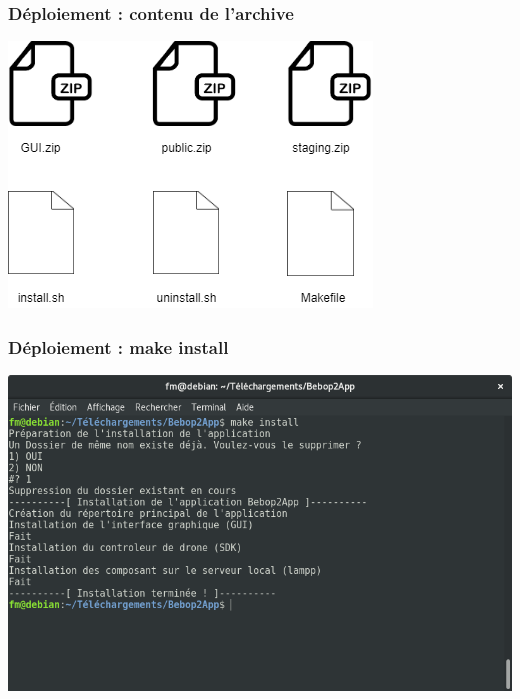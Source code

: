 \documentclass{beamer}
\begin{document}
	
	\begin{frame}
		\begin{center}
		\frametitle{Déploiement : contenu de l'archive}
        \includegraphics[scale=0.55]{contenu_archive.png}
		\end{center}
	\end{frame}
	
	
	\begin{frame}
		\begin{center}
		\frametitle{Déploiement : make install}
        \includegraphics[scale=0.4]{make_install.png}
		\end{center}
	\end{frame}
\end{document}

